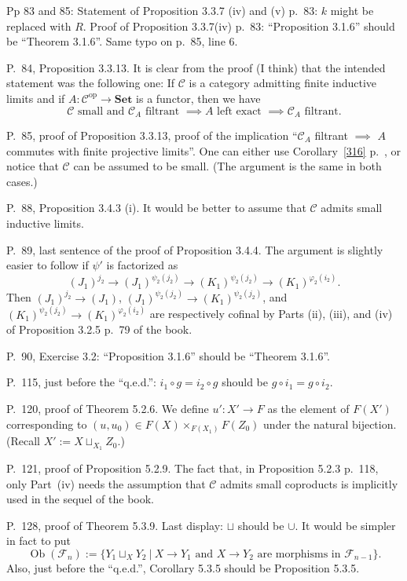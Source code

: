 \documentclass[12pt]{article}
\theoremstyle{remark}
\theoremstyle{definition}
\newcommand{\C}{\mathcal C}
\newcommand{\F}{\mathcal F}
\newcommand{\Set}{\mathbf{Set}}
\DeclareMathOperator{\Ob}{Ob}
\DeclareMathOperator{\op}{op}
\begin{document}
\noindent Pp 83 and 85: Statement of Proposition 3.3.7 (iv) and (v) p.~83: $k$ might be replaced with $R$. %
Proof of Proposition 3.3.7(iv) p.~83: ``Proposition 3.1.6'' should be ``Theorem 3.1.6''. Same typo on p.~85, line 6. 

\noindent P.~84, Proposition 3.3.13. It is clear from the proof (I think) that the intended statement was the following one: If $\C$ is a category admitting finite inductive limits and if $A:\C^{\op}\to\Set$ is a functor, then we have 
$$
\C\text{ small and }\C_A\text{ filtrant }\implies A\text{ left exact }\implies\C_A\text{ filtrant}.
$$

\noindent P.~85, proof of Proposition 3.3.13, proof of the implication ``$\C_A$ filtrant $\implies$ $A$ commutes with finite projective limits''. One can either use Corollary~\ref{316} p.~\pageref{316}, or notice that $\C$ can be assumed to be small. (The argument is the same in both cases.)

\noindent P.~88, Proposition 3.4.3 (i). It would be better to assume that $\C$ admits small inductive limits.

\noindent P.~89, last sentence of the proof of Proposition 3.4.4. The argument is slightly easier to follow if $\psi'$ is factorized as 
$$
(J_1)^{j_2}\to(J_1)^{\psi_2(j_2)}\to(K_1)^{\psi_2(j_2)}\to(K_1)^{\varphi_2(i_2)}.
$$ 
Then $(J_1)^{j_2}\to(J_1)$, $(J_1)^{\psi_2(j_2)}\to(K_1)^{\psi_2(j_2)}$, and $(K_1)^{\psi_2(j_2)}\to(K_1)^{\varphi_2(i_2)}$ are respectively cofinal by Parts (ii), (iii), and (iv) of Proposition 3.2.5 p.~79 of the book.

\noindent P.~90, Exercise 3.2: ``Proposition 3.1.6'' should be ``Theorem 3.1.6''.

\noindent P.~115, just before the ``q.e.d.'': $i_1\circ g=i_2\circ g$ should be $g\circ i_1=g\circ i_2$.

\noindent P.~120, proof of Theorem 5.2.6. We define $u':X'\to F$ as the element of $F(X')$ corresponding to $(u,u_0)\in F(X)\times_{F(X_1)}F(Z_0)$ under the natural bijection. (Recall $X':=X\sqcup_{X_1}Z_0$.)

\noindent P.~121, proof of Proposition 5.2.9. The fact that, in Proposition 5.2.3 p.~118, only Part~(iv) needs the assumption that $\C$ admits small coproducts is implicitly used in the sequel of the book.

\noindent P.~128, proof of Theorem 5.3.9. Last display: $\sqcup$ should be $\cup$. It would be simpler in fact to put 
$$
\Ob(\F_n):=\{Y_1\sqcup_XY_2\ |\ X\to Y_1\text{ and }X\to Y_2\text{ are morphisms in }\F_{n-1}\}.
$$ 
Also, just before the ``q.e.d.'', Corollary 5.3.5 should be Proposition 5.3.5. 
\end{document}
